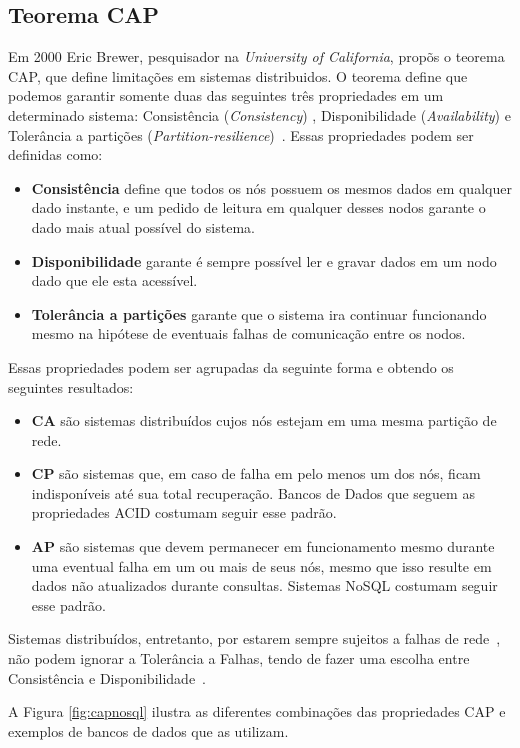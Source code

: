\subsection{Teorema CAP}
\label{sec:cap}
	Em 2000 Eric Brewer, pesquisador na \emph{University of California}, propõs o teorema CAP, que define limitações em sistemas distribuidos. O teorema define que podemos garantir somente duas das seguintes três propriedades em um determinado sistema: Consistência (\emph{Consistency}) , Disponibilidade (\emph{Availability}) e Tolerância a partições (\emph{Partition-resilience})~\cite{brewer}. Essas propriedades podem ser definidas como:
    \begin{itemize}
	\item \textbf{Consistência} define que todos os nós possuem os mesmos dados em qualquer dado instante, e um pedido de leitura em qualquer desses nodos garante o dado mais atual possível do sistema.
    \item \textbf{Disponibilidade} garante é sempre possível ler e gravar dados em um nodo dado que ele esta acessível. 
    \item \textbf{Tolerância a partições} garante que o sistema ira continuar funcionando mesmo na hipótese de eventuais falhas de comunicação entre os nodos.
	\end{itemize}
	
    Essas propriedades podem ser agrupadas da seguinte forma e obtendo os seguintes resultados:
    \begin{itemize}
    \item \textbf{CA} são sistemas distribuídos cujos nós estejam em uma mesma partição de rede.
    \item \textbf{CP} são sistemas que, em caso de falha em pelo menos um dos nós, ficam indisponíveis até sua total recuperação. Bancos de Dados que seguem as propriedades ACID costumam seguir esse padrão.
    \item \textbf{AP} são sistemas que devem permanecer em funcionamento mesmo durante uma eventual falha em um ou mais de seus nós, mesmo que isso resulte em dados não atualizados durante consultas. Sistemas NoSQL costumam seguir esse padrão.  
	\end{itemize}
    
    Sistemas distribuídos, entretanto, por estarem sempre sujeitos a falhas de rede~\cite{deutsch}, não podem ignorar a Tolerância a Falhas, tendo de fazer uma escolha entre Consistência e Disponibilidade~\cite{brewer12years}.
    
    A Figura \ref{fig:capnosql} ilustra as diferentes combinações das propriedades CAP e exemplos de bancos de dados que as utilizam.
    

